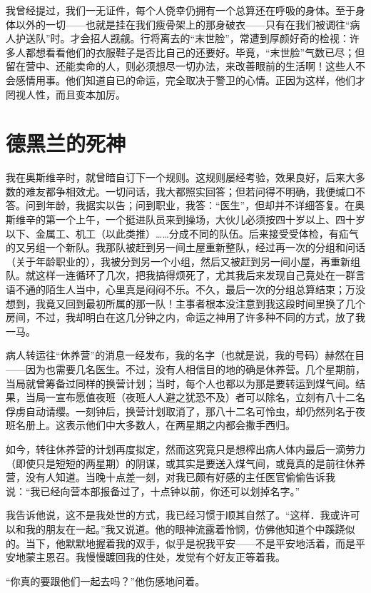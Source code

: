 \documentclass[11pt,oneside]{book}
\begin{document}
\begin{common-format}
我曾经提过，我们一无证件，每个人侥幸仍拥有一个总算还在呼吸的身体。至于身体以外的一切——也就是挂在我们瘦骨架上的那身破衣——只有在我们被调往“病人护送队”时。才会招人觊觎。行将离去的“末世脸”，常遭到厚颜好奇的检视：许多人都想看看他们的衣服鞋子是否比自己的还要好。毕竟，“末世脸”气数已尽；但留在营中、还能卖命的人，则必须想尽一切办法，来改善眼前的生活啊！这些人不会感情用事。他们知道自已的命运，完全取决于警卫的心情。正因为这样，他们才罔视人性，而且变本加厉。


\section{德黑兰的死神}
我在奥斯维辛时，就曾暗自订下一个规则。这规则屡经考验，效果良好，后来大多数的难友都争相效尤。一切问话，我大都照实回答；但若问得不明确，我便缄口不答。问到年龄，我据实以告；问到职业，我答：“医生”，但却并不详细答复。在奥斯维辛的第一个上午，一个挺进队员来到操场，大伙儿必须按四十岁以上、四十岁以下、金属工、机工（以此类推）……分成不同的队伍。后来接受受体检，有疝气的又另组一个新队。我那队被赶到另一间土屋重新整队，经过再一次的分组和问话（关于年龄职业的），我被分到另一个小组，然后又被赶到另一间小屋，再重新组队。就这样一连循环了几次，把我搞得烦死了，尤其我后来发现自己竟处在一群言语不通的陌生人当中，心里真是闷闷不乐。不久，最后一次的分组总算结束；万没想到，我竟又回到最初所属的那一队！主事者根本没注意到我这段时间里换了几个房间，不过，我却明白在这几分钟之内，命运之神用了许多种不同的方式，放了我一马。

病人转运往“休养营”的消息一经发布，我的名字（也就是说，我的号码）赫然在目——因为也需要几名医生。不过，没有人相信目的地的确是休养营。几个星期前，当局就曾筹备过同样的换营计划；当时，每个人也都以为那是要转运到煤气间。结果，当局一宣布愿值夜班（夜班人人避之犹恐不及）者可以除名，立刻有八十二名俘虏自动请缨。一刻钟后，换营计划取消了，那八十二名可怜虫，却仍然列名于夜班名册上。这表示他们中大多数人，在两星期之内都会撒手西归。

如今，转往休养营的计划再度拟定，然而这究竟只是想榨出病人体内最后一滴劳力（即使只是短短的两星期）的阴谋，或其实是要送入煤气间，或竟真的是前往休养营，没有人知道。当晚十点差一刻，对我已颇有好感的主任医官偷偷告诉我说：“我已经向营本部报备过了，十点钟以前，你还可以划掉名字。”

我告诉他说，这不是我处世的方式，我已经习惯于顺其自然了。“这样．我或许可以和我的朋友在一起。”我又说道。他的眼神流露着怜悯，仿佛他知道个中蹊跷似的。当下，他默默地握着我的双手，似乎是祝我平安——不是平安地活着，而是平安地蒙主恩召。我慢慢踱回我的住处，发觉有个好友正等着我。

“你真的要跟他们一起去吗？”他伤感地问着。


\end{common-format}
\end{document}
